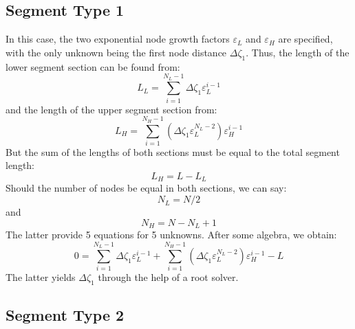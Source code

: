\documentclass{warpdoc}
\newcommand{\mfd}{\displaystyle}
\begin{document}
\subsection{Segment Type 1}

In this case, the two exponential node growth factors
$\varepsilon_L$ and $\varepsilon_H$ are specified,
with the only unknown being the first node distance
$\Delta \zeta_1$. Thus, the length of the lower segment section can be found from:
%
\begin{equation}
L_L=\mfd\sum_{i=1}^{N_L-1} \Delta \zeta_1 \varepsilon_L^{i-1} 
\end{equation}
%
and the length of the upper segment section  from:
%
\begin{equation}
 L_H=\mfd\sum_{i=1}^{N_H-1} \left( \Delta \zeta_1 \varepsilon_L^{N_L-2}  \right) \varepsilon_H^{i-1} 
\end{equation}
%
But the sum of the lengths of both sections must be equal to the total segment length:
%
\begin{equation}
L_H=L-L_L 
\end{equation}
%
Should the number of nodes be equal in both sections, we can say:
%
\begin{equation}
N_L=N/2 
\end{equation}
%
and
%
\begin{equation}
N_H=N-N_L+1
\end{equation}
%
The latter provide 5 equations for 5 unknowns. After some algebra, we obtain:
%
\begin{equation}
0=\mfd\sum_{i=1}^{N_L-1} \Delta \zeta_1 \varepsilon_L^{i-1}
+\mfd\sum_{i=1}^{N_H-1} \left( \Delta \zeta_1 \varepsilon_L^{N_L-2}  \right) \varepsilon_H^{i-1}
-L
\end{equation}
%
The latter yields $\Delta \zeta_1$ through the help of a root solver.







\subsection{Segment Type 2}
\end{document}
